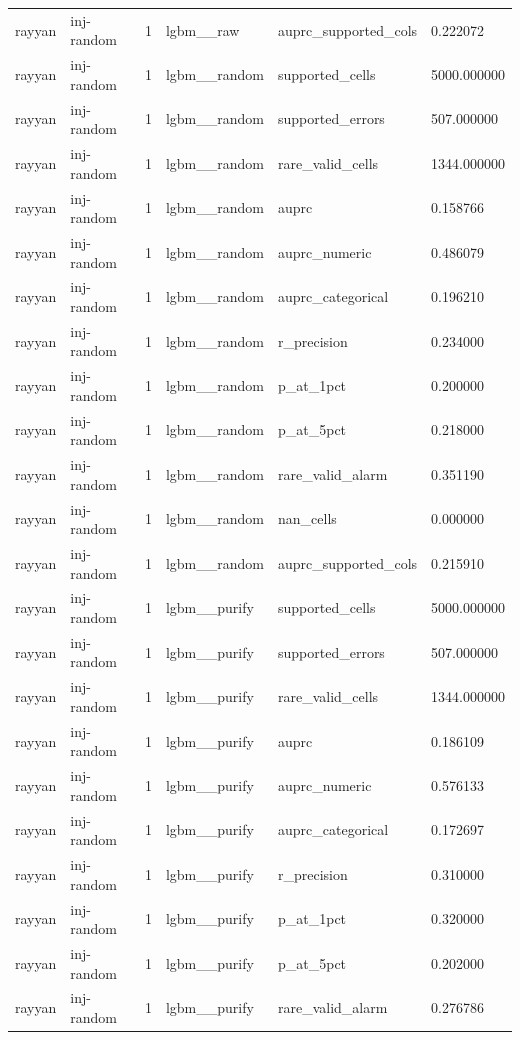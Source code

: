 \begin{tabular}{llllll}
rayyan & inj-random & 1 & lgbm\_\_raw & auprc\_supported\_cols & 0.222072 \\
rayyan & inj-random & 1 & lgbm\_\_random & supported\_cells & 5000.000000 \\
rayyan & inj-random & 1 & lgbm\_\_random & supported\_errors & 507.000000 \\
rayyan & inj-random & 1 & lgbm\_\_random & rare\_valid\_cells & 1344.000000 \\
rayyan & inj-random & 1 & lgbm\_\_random & auprc & 0.158766 \\
rayyan & inj-random & 1 & lgbm\_\_random & auprc\_numeric & 0.486079 \\
rayyan & inj-random & 1 & lgbm\_\_random & auprc\_categorical & 0.196210 \\
rayyan & inj-random & 1 & lgbm\_\_random & r\_precision & 0.234000 \\
rayyan & inj-random & 1 & lgbm\_\_random & p\_at\_1pct & 0.200000 \\
rayyan & inj-random & 1 & lgbm\_\_random & p\_at\_5pct & 0.218000 \\
rayyan & inj-random & 1 & lgbm\_\_random & rare\_valid\_alarm & 0.351190 \\
rayyan & inj-random & 1 & lgbm\_\_random & nan\_cells & 0.000000 \\
rayyan & inj-random & 1 & lgbm\_\_random & auprc\_supported\_cols & 0.215910 \\
rayyan & inj-random & 1 & lgbm\_\_purify & supported\_cells & 5000.000000 \\
rayyan & inj-random & 1 & lgbm\_\_purify & supported\_errors & 507.000000 \\
rayyan & inj-random & 1 & lgbm\_\_purify & rare\_valid\_cells & 1344.000000 \\
rayyan & inj-random & 1 & lgbm\_\_purify & auprc & 0.186109 \\
rayyan & inj-random & 1 & lgbm\_\_purify & auprc\_numeric & 0.576133 \\
rayyan & inj-random & 1 & lgbm\_\_purify & auprc\_categorical & 0.172697 \\
rayyan & inj-random & 1 & lgbm\_\_purify & r\_precision & 0.310000 \\
rayyan & inj-random & 1 & lgbm\_\_purify & p\_at\_1pct & 0.320000 \\
rayyan & inj-random & 1 & lgbm\_\_purify & p\_at\_5pct & 0.202000 \\
rayyan & inj-random & 1 & lgbm\_\_purify & rare\_valid\_alarm & 0.276786 \\

\end{tabular}
